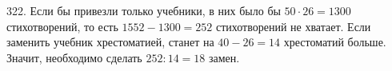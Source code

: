 322. Если бы привезли только учебники, в них было бы $50\cdot26=1300$ стихотворений, то есть $1552-1300=252$ стихотворений не хватает. Если заменить учебник хрестоматией, станет на $40-26=14$ хрестоматий больше. Значит, необходимо сделать $252:14=18$ замен.\\
